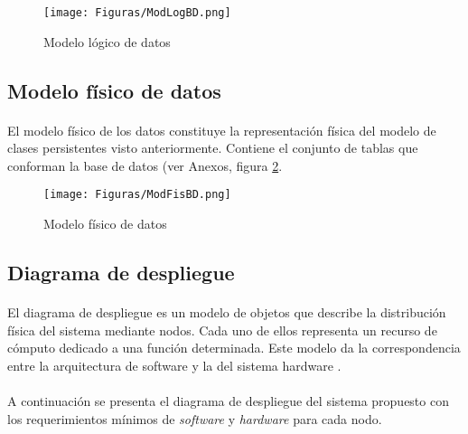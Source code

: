 \begin{landscape}
\begin{figure}[H] %
	\centering
	\texttt{[image: Figuras/ModLogBD.png]}
	\caption{Modelo lógico de datos}
	\label{fig:ModLogBD}
\end{figure}

\subsection{Modelo físico de datos}
\paragraph{}El modelo físico de los datos constituye la representación física del modelo de clases persistentes visto anteriormente. Contiene el conjunto de tablas que conforman la base de datos (ver Anexos, figura \ref{fig:ModFisBD}.

\begin{figure}[H] %
	\centering
	\texttt{[image: Figuras/ModFisBD.png]}
	\caption{Modelo físico de datos}
	\label{fig:ModFisBD}
\end{figure}

\end{landscape}

\subsection{Diagrama de despliegue}
\paragraph{}El diagrama de despliegue es un modelo de objetos que describe la distribución física del sistema mediante nodos. Cada uno de ellos representa un recurso de cómputo dedicado a una función determinada. Este modelo da la correspondencia entre la arquitectura de software y la del sistema hardware \cite{sparxsystems_diagrama_nodate}.
\paragraph{}A continuación se presenta el diagrama de despliegue del sistema propuesto con los requerimientos mínimos de \textit{software} y \textit{hardware} para cada nodo.

